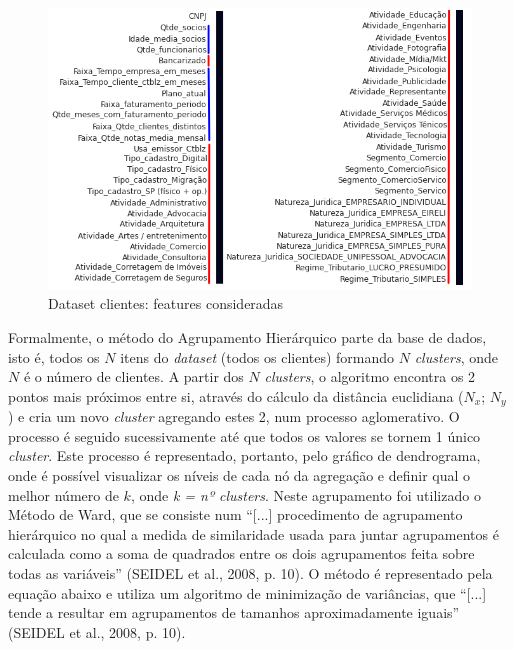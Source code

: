 \documentclass[twocolumn]{rbef}
\newcommand{\1}{\mathbbm{1}}
\begin{document}
\begin{figure}[!htb]
  \includegraphics[scale=0.5]{1. Dataset clientes - variaveis.png}
  \caption{Dataset clientes: features consideradas}
  \label{fig1}
\end{figure}
\newline\linebreak Formalmente, o método do Agrupamento Hierárquico parte da base de dados, isto é, todos os $N$ itens do \emph{dataset} (todos os clientes) formando $N$ \emph{clusters}, onde $N$ é o número de clientes. A partir dos $N$ \emph{clusters}, o algoritmo encontra os 2 pontos mais próximos entre si, através do cálculo da distância euclidiana ($N_x$; $N_y$) e cria um novo \emph{cluster} agregando estes 2, num processo aglomerativo. O processo é seguido sucessivamente até que todos os valores se tornem 1 único \emph{cluster}. Este processo é representado, portanto, pelo gráfico de dendrograma, onde é possível visualizar os níveis de cada nó da agregação e definir qual o melhor número de $k$, onde \emph{k = nº clusters}. 
Neste agrupamento foi utilizado o Método de Ward, que se consiste num “[...] procedimento de agrupamento hierárquico no qual a medida de similaridade usada para juntar agrupamentos é calculada como a soma de quadrados entre os dois agrupamentos feita sobre todas as variáveis” (SEIDEL et al., 2008, p. 10)\cite{SEIDEL}. O método é representado pela equação abaixo e utiliza um algoritmo de minimização de variâncias, que “[...] tende a resultar em agrupamentos de tamanhos aproximadamente iguais” (SEIDEL et al., 2008, p. 10)\cite{SEIDEL}.
\end{document}
